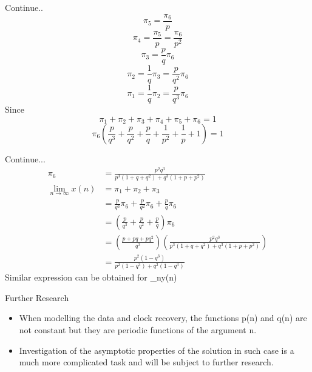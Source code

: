 \documentclass{beamer}
\begin{document}
\begin{frame}
  \begin{block}{Continue..}
    \[\pi_5=\frac{\pi_6}{p}\]
    \[\pi_4=\frac{\pi_5}{p}=\frac{\pi_6}{p^2}\]
    \[\pi_3=\frac{p}{q}\pi_6\]
    \[\pi_2=\frac{1}{q}\pi_3=\frac{p}{q^2}\pi_6\]
    \[\pi_1=\frac{1}{q}\pi_2=\frac{p}{q^3}\pi_6\]
    Since 
    \[\pi_1+\pi_2+\pi_3+\pi_4+\pi_5+\pi_6=1\]
    \[\pi_6\left(\frac{p}{q^3}+\frac{p}{q^2}+\frac{p}{q}+\frac{1}{p^2}+\frac{1}{p}+1\right)=1\]
   \end{block}  
   
\end{frame}
\begin{frame}
  \begin{block}{Continue...}
  \begin{align}
      \pi_6 & =\frac{p^2q^3}{p^3(1+q+q^2)+q^3(1+p+p^2)} \nonumber \\
      \lim_{n\to\infty}x(n) &= \pi_1+\pi_2+\pi_3 \nonumber \\
                            &=\frac{p}{q^3}\pi_6+\frac{p}{q^2}\pi_6+\frac{p}{q}\pi_6 \nonumber \\ &=\left(\frac{p}{q^3}+\frac{p}{q^2}+\frac{p}{q}\right)\pi_6 \nonumber  \\
                            &=\left(\frac{p+pq+pq^2}{q^3}\right)\left(\frac{p^2q^3}{p^3(1+q+q^2)+q^3(1+p+p^2)}\right) \nonumber \\
                            &=\frac{p^2(1-q^3)}{p^2(1-q^3)+q^2(1-q^3)} \nonumber
  \end{align}
  Similar expression can be obtained for \lim_{n\to\infty}y(n)
    
  \end{block}
    
\end{frame}
\begin{frame}
  \begin{block}{Further Research}
  \begin{itemize}
  \item When modelling the data and clock recovery, the functions
  p(n) and q(n) are not constant but they are periodic functions of the
  argument n.
  \item Investigation of the asymptotic properties of the solution in such case is a much more complicated task and will be subject to further research.
  \end{itemize}
  \end{block}
    
\end{frame}
    
\end{document}
